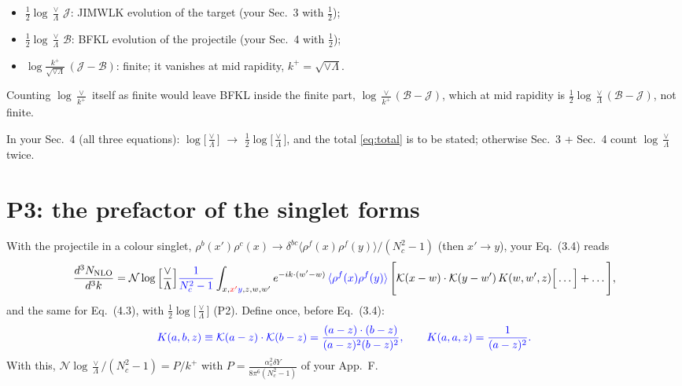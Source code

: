 \documentclass[10pt]{article}
\numberwithin{equation}{section}
\newcommand{\new}[1]{{\color{blue}#1}}
\newcommand{\old}[1]{{\color{red}#1}}
\newcommand{\NN}{\mathcal N}
\begin{document}
\begin{itemize}
\item $\frac12\log\frac{\vee}{\Lambda}\,\mathcal J$: JIMWLK evolution of the target (your Sec.~3 with $\frac12$);
\item $\frac12\log\frac{\vee}{\Lambda}\,\mathcal B$: BFKL evolution of the projectile (your Sec.~4 with $\frac12$);
\item $\log\frac{k^+}{\sqrt{\vee\Lambda}}\,(\mathcal J-\mathcal B)$: finite; it vanishes at mid rapidity, $k^+=\sqrt{\vee\Lambda}$.
\end{itemize}
Counting $\log\frac{\vee}{k^+}$ itself as finite would leave BFKL inside the finite part, $\log\frac{\vee}{k^+}(\mathcal B-\mathcal J)$, which at mid rapidity is $\frac12\log\frac{\vee}{\Lambda}(\mathcal B-\mathcal J)$, not finite.

In your Sec.~4 (all three equations): \old{$\log\Big[\frac{\vee}{\Lambda}\Big]$} $\to$ \new{$\frac12\log\Big[\frac{\vee}{\Lambda}\Big]$}, and the total \eqref{eq:total} is to be stated; otherwise Sec.~3 + Sec.~4 count $\log\frac{\vee}{\Lambda}$ twice.

\section{P3: the prefactor of the singlet forms}\label{sec:p3}
With the projectile in a colour singlet, $\rho^b(x')\rho^c(x)\to\delta^{bc}\langle\rho^f(x)\rho^f(y)\rangle/(N_c^2-1)$ (then $x'\to y$), your Eq.~(3.4) reads
\begin{equation}
\frac{d^3N_{\rm NLO}}{d^3k}=\NN\log\Big[\frac{\vee}{\Lambda}\Big]\new{\frac{1}{N_c^2-1}}\int_{x,\old{x'}\new{y},z,w,w'}e^{-ik\cdot(w'-w)}\,\new{\langle\rho^f(x)\rho^f(y)\rangle}\,\Bigg[\mathcal K(x-w)\cdot\mathcal K(y-w')\,K(w,w',z)\Big[\dots\Big]+\dots\Bigg],
\end{equation}
and the same for Eq.~(4.3), with \new{$\frac12\log\big[\frac{\vee}{\Lambda}\big]$} (P2). Define once, before Eq.~(3.4):
\begin{equation}
\new{K(a,b,z)\equiv\mathcal K(a-z)\cdot\mathcal K(b-z)=\frac{(a-z)\cdot(b-z)}{(a-z)^2(b-z)^2},\qquad K(a,a,z)=\frac{1}{(a-z)^2}.}
\end{equation}
With this, $\NN\log\frac{\vee}{\Lambda}/(N_c^2-1)=P/k^+$ with $P=\frac{\alpha_s^2\delta Y}{8\pi^6(N_c^2-1)}$ of your App.~F.

\end{document}
